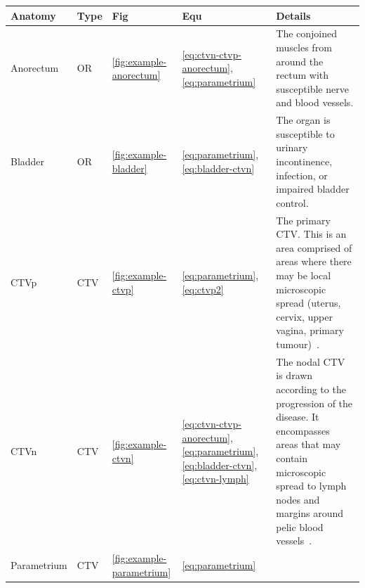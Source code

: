 \documentclass[11pt,twoside]{report}
\begin{document}
\begin{landscape}
  \begin{table}[h!]
    \centering
    \begin{tabularx}{\linewidth}{l l l l X}
      \toprule
      \textbf{Anatomy} & \textbf{Type} & \textbf{Fig} & \textbf{Equ} & \textbf{Details} \\
      \midrule
      Anorectum & OR & \ref{fig:example-anorectum} & \ref{eq:ctvn-ctvp-anorectum}, \ref{eq:parametrium} & The conjoined muscles from around the rectum with susceptible nerve and blood vessels. \\
      \midrule
      Bladder & OR & \ref{fig:example-bladder}  & \ref{eq:parametrium}, \ref{eq:bladder-ctvn} & The organ is susceptible to urinary incontinence, infection, or impaired bladder control. \\
      \midrule     
      CTVp & CTV & \ref{fig:example-ctvp} & \ref{eq:parametrium}, \ref{eq:ctvp2} &      
      The primary CTV. This is an area comprised of areas where there may be local microscopic spread (uterus, cervix, upper vagina, primary tumour)~\cite{AMLART-data}.
      \\
      \midrule
      CTVn & CTV & \ref{fig:example-ctvn} & \ref{eq:ctvn-ctvp-anorectum}, \ref{eq:parametrium}, \ref{eq:bladder-ctvn}, \ref{eq:ctvn-lymph} & 
      
      The nodal CTV is drawn according to the progression of the disease. It encompasses areas that may contain microscopic spread to lymph nodes and margins around pelic blood vessels~\cite{AMLART-data}.
      \\
      \midrule
      Parametrium & CTV & \ref{fig:example-parametrium} & \ref{eq:parametrium} & 
      

\end{tabularx}
\end{table}
\end{landscape}
\end{document}
